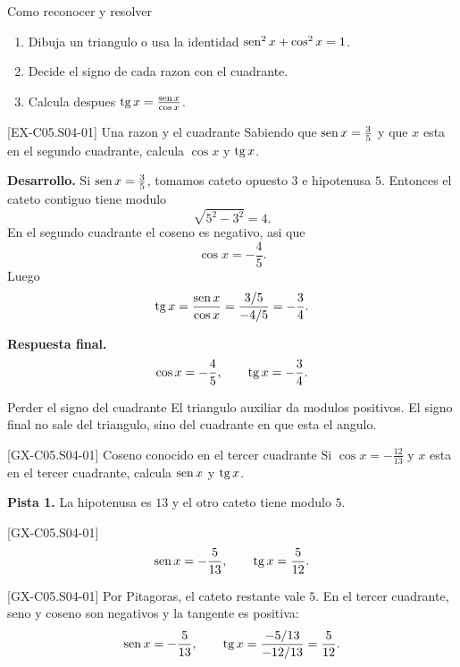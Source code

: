 \begin{methodbox}{Como reconocer y resolver}
\begin{enumerate}
  \item Dibuja un triangulo o usa la identidad \(\operatorname{sen}^2 x+\cos^2 x=1\).
  \item Decide el signo de cada razon con el cuadrante.
  \item Calcula despues \(\operatorname{tg} x=\frac{\operatorname{sen} x}{\cos x}\).
\end{enumerate}
\end{methodbox}

\begin{solvedexample}{[EX-C05.S04-01] Una razon y el cuadrante}
Sabiendo que \(\operatorname{sen} x=\frac{3}{5}\) y que \(x\) esta en el segundo cuadrante, calcula
\(\cos x\) y \(\operatorname{tg} x\).

\textbf{Desarrollo.} Si \(\operatorname{sen} x=\frac{3}{5}\), tomamos cateto opuesto \(3\) e hipotenusa \(5\).
Entonces el cateto contiguo tiene modulo
\[
\sqrt{5^2-3^2}=4.
\]
En el segundo cuadrante el coseno es negativo, asi que
\[
\cos x=-\frac{4}{5}.
\]
Luego
\[
\operatorname{tg} x=\frac{\operatorname{sen} x}{\cos x}=\frac{3/5}{-4/5}=-\frac{3}{4}.
\]

\textbf{Respuesta final.}
\[
\cos x=-\frac{4}{5},
\qquad
\operatorname{tg} x=-\frac{3}{4}.
\]
\end{solvedexample}

\begin{commonerror}{Perder el signo del cuadrante}
El triangulo auxiliar da modulos positivos. El signo final no sale del triangulo, sino del
cuadrante en que esta el angulo.
\end{commonerror}

\begin{guidedexercise}{[GX-C05.S04-01] Coseno conocido en el tercer cuadrante}
Si \(\cos x=-\frac{12}{13}\) y \(x\) esta en el tercer cuadrante, calcula \(\operatorname{sen} x\) y
\(\operatorname{tg} x\).

\textbf{Pista 1.} La hipotenusa es \(13\) y el otro cateto tiene modulo \(5\).
\end{guidedexercise}

\begin{shortanswer}{[GX-C05.S04-01]}
\[
\operatorname{sen} x=-\frac{5}{13},
\qquad
\operatorname{tg} x=\frac{5}{12}.
\]
\end{shortanswer}

\begin{fullsolution}{[GX-C05.S04-01]}
Por Pitagoras, el cateto restante vale \(5\). En el tercer cuadrante, seno y coseno son
negativos y la tangente es positiva:
\[
\operatorname{sen} x=-\frac{5}{13},
\qquad
\operatorname{tg} x=\frac{-5/13}{-12/13}=\frac{5}{12}.
\]
\end{fullsolution}

